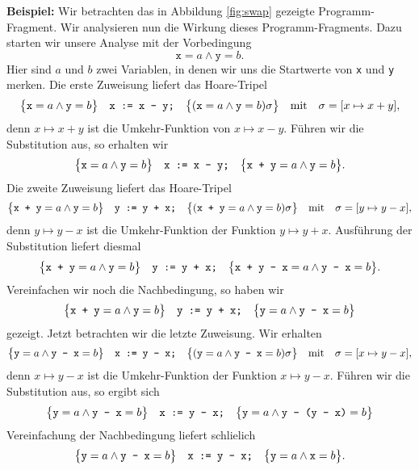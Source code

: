 \vspace*{0.3cm}

\noindent
\textbf{Beispiel:}
Wir betrachten  das in
Abbildung \ref{fig:swap} gezeigte Programm-Fragment.  Wir analysieren nun die Wirkung
dieses Programm-Fragments.  Dazu starten wir unsere Analyse mit der Vorbedingung
\[ \texttt{x} = a \wedge \texttt{y} = b. \]
Hier sind $a$ und $b$ zwei Variablen, in denen wir uns die Startwerte von \texttt{x} und
\texttt{y} merken.  Die erste Zuweisung liefert das Hoare-Tripel
\[ \bigl\{\texttt{x} = a \wedge \texttt{y} = b\bigr\}\quad\texttt{x := x - y;}\quad\bigl\{(\texttt{x} = a \wedge \texttt{y} = b)\sigma\bigr\} 
   \quad \mathrm{mit} \quad \sigma = [x \mapsto x + y],
\]
denn $x \mapsto x + y$ ist die Umkehr-Funktion von $x \mapsto x - y$.  F\"uhren wir die Substitution
aus, so erhalten wir
\begin{equation}
  \label{eq:swap1}
 \bigl\{\texttt{x} = a \wedge \texttt{y} = b\bigr\}\quad\texttt{x := x - y;}\quad\bigl\{\texttt{x + y} = a \wedge \texttt{y} = b\bigr\}.   
\end{equation}
Die zweite Zuweisung liefert das Hoare-Tripel
\[ \bigl\{\texttt{x + y} = a \wedge \texttt{y} = b\bigr\}\quad\texttt{y := y + x;}\quad\bigl\{(\texttt{x + y} = a \wedge \texttt{y} = b)\sigma\bigr\} 
   \quad \mathrm{mit} \quad \sigma = [y \mapsto y - x],
\]
denn $y \mapsto y - x$ ist die Umkehr-Funktion der Funktion $y \mapsto y + x$.
Ausf\"uhrung der Substitution liefert diesmal
\[ \bigl\{\texttt{x + y} = a \wedge \texttt{y} = b\bigr\}\quad\texttt{y := y + x;}\quad\bigl\{
          \texttt{x + y - x} = a \wedge \texttt{y - x} = b\bigr\}.
\]
Vereinfachen wir noch die Nachbedingung, so haben wir 
\begin{equation}
  \label{eq:swap2}
 \bigl\{\texttt{x + y} = a \wedge \texttt{y} = b\bigr\}\quad\texttt{y := y + x;}\quad\bigl\{ \texttt{y} = a \wedge \texttt{y - x} = b\bigr\}  
\end{equation}
gezeigt. Jetzt betrachten wir die letzte Zuweisung.  Wir erhalten
\[ \bigl\{\texttt{y} = a \wedge \texttt{y - x} = b\bigr\}\quad\texttt{x := y - x;}\quad\bigl\{
          (\texttt{y} = a \wedge \texttt{y - x} = b)\sigma\bigr\} 
   \quad \mathrm{mit} \quad \sigma = [x \mapsto y - x],
\]
denn $x \mapsto y - x$ ist die Umkehr-Funktion der Funktion $x \mapsto y - x$.
F\"uhren wir die Substitution aus, so ergibt sich
\[ \bigl\{\texttt{y} = a \wedge \texttt{y - x} = b\bigr\}\quad\texttt{x := y - x;}\quad\bigl\{
          \texttt{y} = a \wedge \texttt{y - (y - x)} = b\bigr\} 
\]
Vereinfachung der Nachbedingung liefert schlie\3lich
\begin{equation}
  \label{eq:swap3}
  \bigl\{\texttt{y} = a \wedge \texttt{y - x} = b\bigr\}\quad\texttt{x := y - x;}\quad\bigl\{ \texttt{y} = a \wedge \texttt{x} = b\bigr\}.   
\end{equation}
